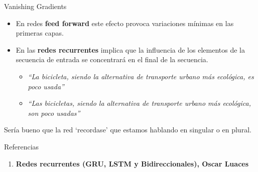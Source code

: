 \documentclass[aspectratio=169]{beamer}
\begin{document}
\begin{frame}{Vanishing Gradients}
	\begin{itemize}
		\item En redes \textbf{feed forward} este efecto provoca variaciones mínimas en las primeras capas.
		\item En las \textbf{redes recurrentes} implica que la influencia de los elementos de la secuencia de entrada se concentrará en el final de la secuencia.
		\begin{itemize}
			\item \textit{``La {\color{blue}bicicleta}, siendo la alternativa de transporte urbano más ecológica, {\color{blue}es} poco usada''}
			\item \textit{``Las {\color{red}bicicletas}, siendo la alternativa de transporte urbano más ecológica, {\color{red}son} poco usadas''}
		\end{itemize}
	\end{itemize}

	\begin{block}{}
		\centering
		Sería bueno que la red `recordase' que estamos hablando en {\color{blue}singular} o en {\color{red}plural}.
	\end{block}

\end{frame}

\begin{frame}[t]{Referencias}
	\begin{enumerate}
	  \item \textbf{Redes recurrentes (GRU, LSTM y Bidireccionales), Oscar Luaces}
	\end{enumerate}
  \end{frame}
\end{document}
